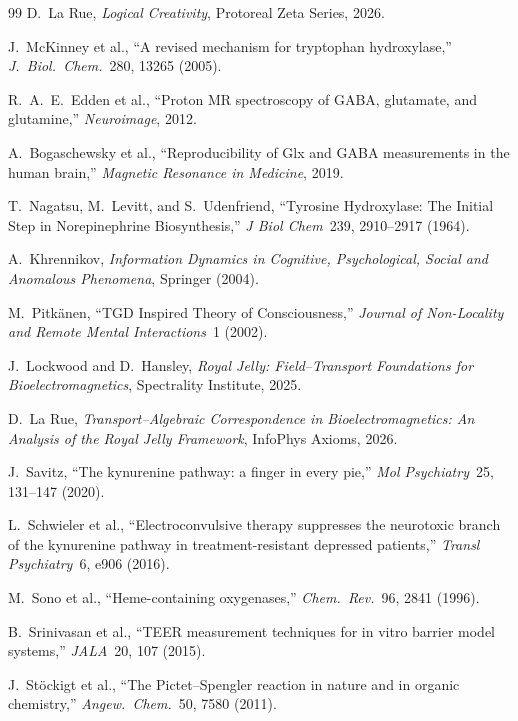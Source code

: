 \begin{thebibliography}{99}
D.~La Rue, \emph{Logical Creativity}, Protoreal Zeta Series, 2026.

J.~McKinney et al., ``A revised mechanism for tryptophan hydroxylase,'' \emph{J.~Biol.~Chem.}\ 280, 13265 (2005).

R.~A.~E.~Edden et al., ``Proton MR spectroscopy of GABA, glutamate, and glutamine,'' \emph{Neuroimage}, 2012.

A.~Bogaschewsky et al., ``Reproducibility of Glx and GABA measurements in the human brain,'' \emph{Magnetic Resonance in Medicine}, 2019.

T.~Nagatsu, M.~Levitt, and S.~Udenfriend, ``Tyrosine Hydroxylase: The Initial Step in Norepinephrine Biosynthesis,'' \emph{J Biol Chem}\ 239, 2910--2917 (1964).

A.~Khrennikov, \emph{Information Dynamics in Cognitive, Psychological, Social and Anomalous Phenomena}, Springer (2004).

M.~Pitk\"anen, ``TGD Inspired Theory of Consciousness,'' \emph{Journal of Non-Locality and Remote Mental Interactions}\ 1 (2002).

J.~Lockwood and D.~Hansley, \emph{Royal Jelly: Field--Transport Foundations for Bioelectromagnetics}, Spectrality Institute, 2025.

D.~La Rue, \emph{Transport--Algebraic Correspondence in Bioelectromagnetics: An Analysis of the Royal Jelly Framework}, InfoPhys Axioms, 2026.

J.~Savitz, ``The kynurenine pathway: a finger in every pie,'' \emph{Mol Psychiatry}\ 25, 131--147 (2020).

L.~Schwieler et al., ``Electroconvulsive therapy suppresses the neurotoxic branch of the kynurenine pathway in treatment-resistant depressed patients,'' \emph{Transl Psychiatry}\ 6, e906 (2016).

M.~Sono et al., ``Heme-containing oxygenases,'' \emph{Chem.\ Rev.}\ 96, 2841 (1996).

B.~Srinivasan et al., ``TEER measurement techniques for in vitro barrier model systems,'' \emph{JALA}\ 20, 107 (2015).

J.~St\"ockigt et al., ``The Pictet--Spengler reaction in nature and in organic chemistry,'' \emph{Angew.~Chem.}\ 50, 7580 (2011).

\end{thebibliography}

